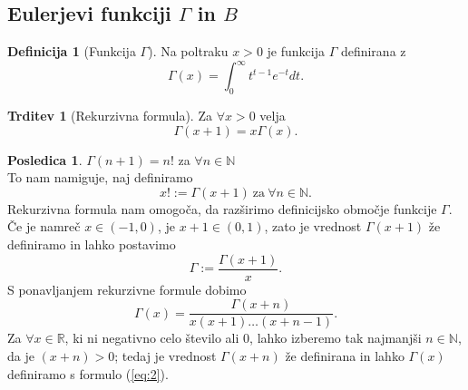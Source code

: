\documentclass[11pt]{article}
\theoremstyle{definition}
\newtheorem{definicija}{Definicija}[section]
\theoremstyle{definition}
\newtheorem{trditev}{Trditev}[section]
\theoremstyle{definition}
\newtheorem*{posledica}{Posledica}
\begin{document}
\subsection{Eulerjevi funkciji $\Gamma$ in $B$}
\vspace{0.5cm}

\begin{definicija}[Funkcija $\Gamma$]

Na poltraku $x > 0$ je funkcija $\Gamma$ definirana z
\begin{equation}
	\Gamma(x) = \int_0^{\infty} t^{t-1} e^{-t} dt.
\end{equation}

\end{definicija}
\vspace{0.5cm}

\begin{trditev}[Rekurzivna formula]

Za $\forall x > 0$ velja
$$\Gamma(x + 1) = x \Gamma(x).$$

\end{trditev}
\vspace{0.5cm}

\begin{posledica}

$\Gamma(n + 1) = n!$ za $\forall n \in \mathbb{N}$ \\

\noindent To nam namiguje, naj definiramo
$$x! := \Gamma(x + 1) ~\text{za}~ \forall n \in \mathbb{N}.$$
Rekurzivna formula nam omogoča, da razširimo definicijsko območje funkcije $\Gamma$. Če je namreč $x \in (-1, 0)$, je $x + 1 \in  (0, 1)$, zato je vrednost $\Gamma(x + 1)$ že definiramo in lahko postavimo
$$\Gamma := \frac{\Gamma(x+1)}{x}.$$
S ponavljanjem rekurzivne formule dobimo
\begin{equation} \label{eq:2}
	\Gamma(x) = \frac{\Gamma(x+n)}{x(x+1)\ldots(x+n-1)}.
\end{equation}
Za $\forall x \in \mathbb{R}$, ki ni negativno celo število ali $0$, lahko izberemo tak najmanjši $n \in \mathbb{N}$, da je $(x + n) > 0$; tedaj je vrednost $\Gamma(x + n)$ že definirana in lahko $\Gamma(x)$ definiramo s formulo (\ref{eq:2}).

\end{posledica}
\vspace{0.5cm}
\end{document}
